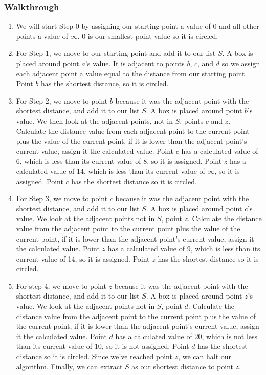 \documentclass{article}
\begin{document}
            \subsubsection{Walkthrough}
                \begin{enumerate}
                    \item We will start Step 0 by assigning our starting point a value of 0 and all other points a value of $\infty$. 0 is our smallest point value so it is circled.
                    
                    \item For Step 1, we move to our starting point and add it to our list $S$. A box is placed around point $a$'s value. It is adjacent to points $b$, $c$, and $d$ so we assign each adjacent point a value equal to the distance from our starting point. Point $b$ has the shortest distance, so it is circled.
                    
                    \item For Step 2, we move to point $b$ because it was the adjacent point with the shortest distance, and add it to our list $S$. A box is placed around point $b$'s value. We then look at the adjacent points, not in $S$, points $c$ and $z$. Calculate the distance value from each adjacent point to the current point plus the value of the current point, if it is lower than the adjacent point's current value, assign it the calculated value. Point $c$ has a calculated value of 6, which is less than its current value of 8, so it is assigned. Point $z$ has a calculated value of 14, which is less than its current value of $\infty$, so it is assigned. Point $c$ has the shortest distance so it is circled.
                    
                    \item For Step 3, we move to point $c$ because it was the adjacent point with the shortest distance, and add it to our list $S$. A box is placed around point $c$'s value. We look at the adjacent points not in $S$, point $z$. Calculate the distance value from the adjacent point to the current point plus the value of the current point, if it is lower than the adjacent point's current value, assign it the calculated value. Point $z$ has a calculated value of 9, which is less than its current value of 14, so it is assigned. Point $z$ has the shortest distance so it is circled.
                    
                    \item For step 4, we move to point $z$ because it was the adjacent point with the shortest distance, and add it to our list $S$. A box is placed around point $z$'s value. We look at the adjacent points not in $S$, point $d$. Calculate the distance value from the adjacent point to the current point plus the value of the current point, if it is lower than the adjacent point's current value, assign it the calculated value. Point $d$ has a calculated value of 20, which is not less than its current value of 10, so it is not assigned. Point $d$ has the shortest distance so it is circled. Since we've reached point $z$, we can halt our algorithm. Finally, we can extract $S$ as our shortest distance to point $z$.


\end{enumerate}
\end{document}
